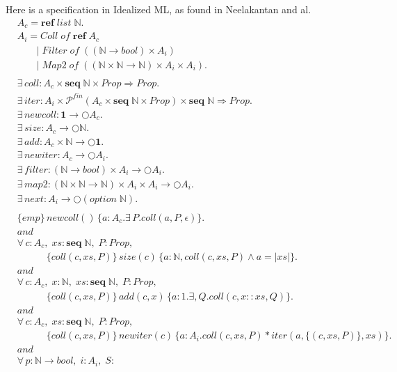 \documentclass[a4paper,english]{article}
\newcommand{\N}[0]{\mathbb{N}}
\newcommand{\PROP}[0]{Prop}
\newcommand{\LIST}[0]{list}
\newcommand{\SEQ}[0]{\mathbf{seq}}
\newcommand{\MONAD}[0]{\bigcirc}
\newcommand{\AND}[0]{and}
\newcommand{\REF}[0]{\mathbf{ref}}
\newcommand{\OPTION}[0]{option}
\newcommand{\EMP}[0]{emp}
\newcommand{\PFIN}[0]{\mathcal{P}^{fin}}
\begin{document}
Here is a specification in Idealized ML, as found in Neelakantan and al.
\begin{align*}
& A_c = \REF\;\LIST\;\N.\\
& A_i = Coll\; of\; \REF\;A_c\\
& \quad\quad |\; Filter\;of\;((\N\rightarrow bool) \times A_i)\\
& \quad\quad |\; Map2\;of\;((\N \times \N \rightarrow
\N) \times A_i \times A_i).\\
& \\
& \exists\, coll : A_c \times \SEQ\; \N \times \PROP \Rightarrow \PROP.\\
& \exists\, iter : A_i \times \PFIN(A_c \times \SEQ\;\N\times
\PROP)\times \SEQ\;\N \Rightarrow \PROP.\\
& \exists\, newcoll : \mathbf{1} \rightarrow \MONAD A_c.\\
& \exists\, size : A_c \rightarrow \MONAD \N.\\
& \exists\, add : A_c \times \N \rightarrow \MONAD \mathbf{1}.\\
& \exists\, newiter : A_c \rightarrow \MONAD A_i.\\
& \exists\, filter : (\N \rightarrow bool) \times A_i \rightarrow
\MONAD A_i.\\
& \exists\, map2 : (\N \times \N \rightarrow \N)
\times A_i \times A_i \rightarrow \MONAD A_i.\\
& \exists\, next : A_i \rightarrow \MONAD (\OPTION\; \N).\\
& \\
& \{\EMP\}\,newcoll()\,\{a : A_c.\exists\,P. coll(a,P,\epsilon)\}.\\
& \AND\\
& \forall\,c : A_c,\; xs : \SEQ\;\N,\; P : \PROP,\\
&\quad\quad\quad \{coll(c,xs,P)\}\,size(c)\,\{a :
\N, coll(c,xs,P) \wedge a = |xs|\}.\\
& \AND\\
& \forall\,c : A_c,\; x : \N,\; xs : \SEQ\;\N,\; P : \PROP,\\
&\quad\quad\quad \{coll(c,xs,P)\}\,add(c,x)\,\{a : 1. \exists, Q.
coll(c,x::xs,Q)\}.\\
& \AND\\
& \forall\,c : A_c,\; xs : \SEQ\;\N,\; P : \PROP,\\
&\quad\quad\quad \{coll(c,xs,P)\}\,newiter(c)\,\{a : A_i. coll(c,xs,P) *
iter (a, \{(c,xs,P)\},xs)\}.\\
& \AND\\
& \forall\,p : \N \rightarrow bool,\; i : A_i,\; S :

\end{align*}
\end{document}

